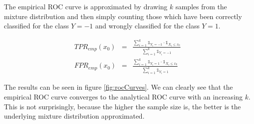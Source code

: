 \documentclass[a4paper, 11pt, titlepage]{article}
\begin{document}
The empirical ROC curve is approximated by drawing $k$ samples from the mixture distribution and then simply counting those which have been correctly classified for the class $Y=-1$ and wrongly classified for the class $Y=1$.

\begin{eqnarray*}
	TPR_{emp}(x_0) &=& \frac{\sum_{i=1}^k \mathds{1}_{Y_i=-1}\cdot \mathds{1}_{X_i \le x_0}}{\sum_{i=1}^k \mathds{1}_{Y_i = -1}}\\
	FPR_{emp}(x_0) &=& \frac{\sum_{i=1}^k \mathds{1}_{Y_i=1}\cdot \mathds{1}_{X_i \le x_0}}{\sum_{i=1}^k \mathds{1}_{Y_i = 1}}
\end{eqnarray*}

The results can be seen in figure \ref{fig:rocCurves}.
We can clearly see that the empirical ROC curve converges to the analytical ROC curve with an increasing $k$.
This is not surprisingly, because the higher the sample size is, the better is the underlying mixture distribution approximated.
\end{document}
